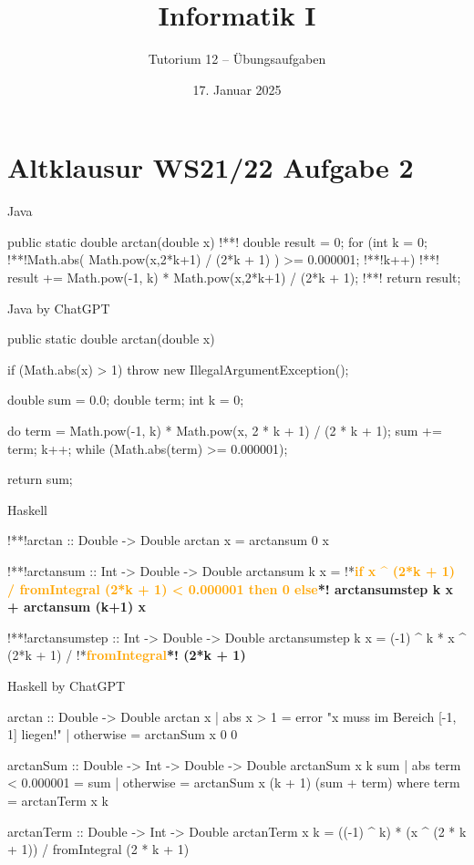 \documentclass[aspectratio=169,usepdftitle=true,11pt,ngerman,t]{beamer}
\subtitle{Tutorium 12 -- Übungsaufgaben}
\date{17. Januar 2025}
\title{Informatik I}
\author{\lqfullname}
\begin{document}

\section{Altklausur WS21/22 Aufgabe 2}

\begin{frame}[fragile]{Java}\onslide<+->
    \begin{plainjava}
public static double arctan(double x) {
!*\onslide<+->*!	double result = 0;
	for (int k = 0; !*\onslide<+->*!Math.abs(
            Math.pow(x,2*k+1) / (2*k + 1)
        ) >= 0.000001; !*\onslide<+->*!k++) {
!*\onslide<+->*!	    result += Math.pow(-1, k) * Math.pow(x,2*k+1) / (2*k + 1);
	}
!*\onslide<+->*!	return result;
}
    \end{plainjava}
\end{frame}

\begin{frame}[fragile]{Java by ChatGPT}
    \begin{plainjava}
public static double arctan(double x) {
    if (Math.abs(x) > 1) throw new IllegalArgumentException();

    double sum = 0.0;
    double term;
    int k = 0;

    do {
        term = Math.pow(-1, k) * Math.pow(x, 2 * k + 1) / (2 * k + 1);
        sum += term;
        k++;
    } while (Math.abs(term) >= 0.000001);

    return sum;
}
    \end{plainjava}
\end{frame}

\begin{frame}[fragile]{Haskell}\onslide<+->
    \begin{plainhaskell}
!*\onslide<+->*!arctan :: Double -> Double
arctan x = arctansum 0 x

!*\onslide<+->*!arctansum :: Int -> Double -> Double
arctansum k x = !*\bfseries\textcolor{orange}{if x \^{} (2*k + 1) / fromIntegral (2*k + 1) < 0.000001 then 0 else}*! arctansumstep k x + arctansum (k+1) x

!*\onslide<+->*!arctansumstep :: Int -> Double -> Double
arctansumstep k x = (-1) ^ k * x ^ (2*k + 1) / !*\bfseries\textcolor{orange}{fromIntegral}*! (2*k + 1)
    \end{plainhaskell}
\end{frame}

\begin{frame}[fragile]{Haskell by ChatGPT}
    \begin{plainhaskell}
arctan :: Double -> Double
arctan x
  | abs x > 1 = error "x muss im Bereich [-1, 1] liegen!"
  | otherwise = arctanSum x 0 0

arctanSum :: Double -> Int -> Double -> Double
arctanSum x k sum
  | abs term < 0.000001 = sum
  | otherwise = arctanSum x (k + 1) (sum + term)
  where
    term = arctanTerm x k

arctanTerm :: Double -> Int -> Double
arctanTerm x k = ((-1) ^ k) * (x ^ (2 * k + 1)) / fromIntegral (2 * k + 1)
    \end{plainhaskell}
\end{frame}
\end{document}
